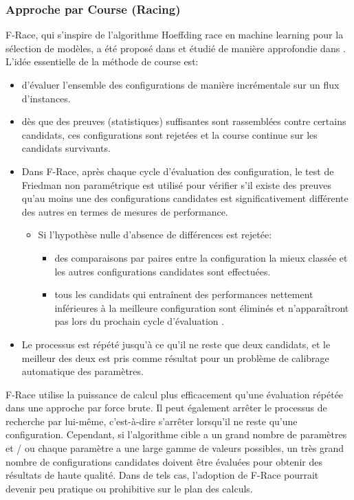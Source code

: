 \documentclass[12pt]{article}
\begin{document}
        \subsubsection{Approche par Course (Racing)}
            F-Race, qui s'inspire de l'algorithme Hoeffding race \cite{maron1994hoeffding, maron1997racing}  en machine learning pour la sélection de modèles, a été proposé dans \cite{birattari2002racing} et étudié de manière approfondie dans \cite{birattari2009tuning}. L'idée essentielle de la méthode de course est:
            \begin{itemize}
                \item d'évaluer l’ensemble des configurations de manière incrémentale sur un flux d'instances. 
                \item dès que des preuves (statistiques) suffisantes sont rassemblées contre certains candidats, ces configurations sont rejetées et la course continue sur les candidats survivants. 
                \item Dans F-Race, après chaque cycle d'évaluation des configuration, le test de Friedman non paramétrique est utilisé pour vérifier s'il existe des preuves qu'au moins une des configurations candidates est significativement différente des autres en termes de mesures de performance. 
                    \begin{itemize}
                        \item Si l'hypothèse nulle d'absence de différences est rejetée:
                            \begin{itemize}
                                \item des comparaisons par paires entre la configuration la mieux classée et les autres configurations candidates sont effectuées.
                                \item tous les candidats qui entraînent des performances nettement inférieures à la meilleure configuration sont éliminés et n'apparaîtront pas lors du prochain cycle d'évaluation \cite{birattari2010f}.
                            \end{itemize}
                    \end{itemize}
                \item Le processus est répété jusqu'à ce qu'il ne reste que deux candidats, et le meilleur des deux est pris comme résultat pour un problème de calibrage automatique des paramètres.                
            \end{itemize}
            F-Race utilise la puissance de calcul plus efficacement qu'une évaluation répétée dans une approche par force brute. Il peut également arrêter le processus de recherche par lui-même, c'est-à-dire s'arrêter lorsqu'il ne reste qu'une configuration. Cependant, si l'algorithme cible a un grand nombre de paramètres et / ou chaque paramètre a une large gamme de valeurs possibles, un très grand nombre de configurations candidates doivent être évaluées pour obtenir des résultats de haute qualité. Dans de tels cas, l'adoption de F-Race pourrait devenir peu pratique ou prohibitive sur le plan des calculs.
\end{document}
